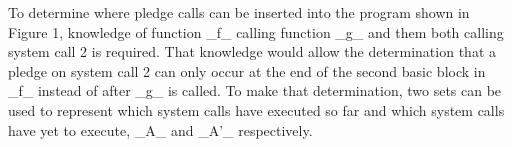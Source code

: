 To determine where pledge calls can be inserted into the program shown in Figure 1, knowledge of function _f_ calling function _g_ and them both calling system call 2 is required. That knowledge would allow the determination that a pledge on system call 2 can only occur at the end of the second basic block in _f_ instead of after _g_ is called. To make that determination, two sets can be used to represent which system calls have executed so far and which system calls have yet to execute, _A_ and _A'_ respectively.